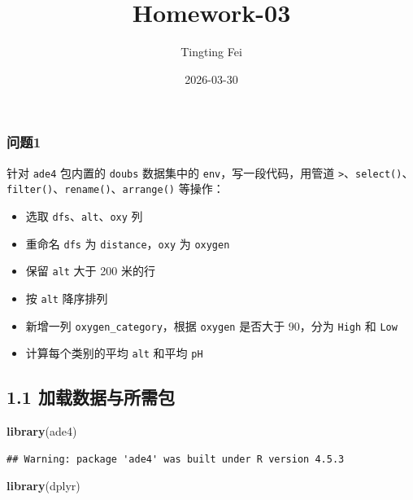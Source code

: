 \documentclass[
]{article}
\title{Homework-03}
\author{Tingting Fei}
\date{2026-03-30}
\newenvironment{Shaded}{\begin{snugshade}}{\end{snugshade}}
\newcommand{\FunctionTok}[1]{\textcolor[rgb]{0.13,0.29,0.53}{\textbf{#1}}}
\newcommand{\NormalTok}[1]{#1}
\providecommand{\tightlist}{%
  \setlength{\itemsep}{0pt}\setlength{\parskip}{0pt}}
\begin{document}
\maketitle

\subsubsection{问题1}\label{ux95eeux98981}

针对 \texttt{ade4} 包内置的 \texttt{doubs} 数据集中的
\texttt{env}，写一段代码，用管道
\texttt{\textbar{}\textgreater{}}、\texttt{select()}、\texttt{filter()}、\texttt{rename()}、\texttt{arrange()}
等操作：

\begin{itemize}
\tightlist
\item
  选取 \texttt{dfs}、\texttt{alt}、\texttt{oxy} 列
\item
  重命名 \texttt{dfs} 为 \texttt{distance}，\texttt{oxy} 为
  \texttt{oxygen}
\item
  保留 \texttt{alt} 大于 200 米的行
\item
  按 \texttt{alt} 降序排列
\item
  新增一列 \texttt{oxygen\_category}，根据 \texttt{oxygen} 是否大于
  90，分为 \texttt{High} 和 \texttt{Low}
\item
  计算每个类别的平均 \texttt{alt} 和平均 \texttt{pH}
\end{itemize}

\subsection{1.1
加载数据与所需包}\label{ux52a0ux8f7dux6570ux636eux4e0eux6240ux9700ux5305}

\begin{Shaded}
\begin{Highlighting}[]
\FunctionTok{library}\NormalTok{(ade4)}
\end{Highlighting}
\end{Shaded}

\begin{verbatim}
## Warning: package 'ade4' was built under R version 4.5.3
\end{verbatim}

\begin{Shaded}
\begin{Highlighting}[]
\FunctionTok{library}\NormalTok{(dplyr)}
\end{Highlighting}
\end{Shaded}
\end{document}
